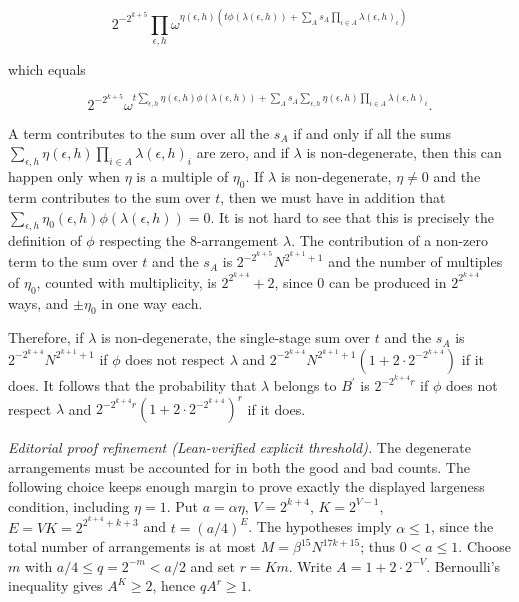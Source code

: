 \documentclass[10pt]{article}
\begin{document}
$$
2^{-2^{k+5}} \prod_{\epsilon, h} \omega^{\eta(\epsilon, h)\left(t \phi(\lambda(\epsilon, h))+\sum_{A} s_{A} \prod_{i \in A}\lambda(\epsilon, h)_{i}\right)}
$$

which equals

$$
2^{-2^{k+5}} \omega^{t \sum_{\epsilon, h} \eta(\epsilon, h) \phi(\lambda(\epsilon, h))+\sum_{A} s_{A} \sum_{\epsilon, h} \eta(\epsilon, h) \prod_{i \in A} \lambda(\epsilon, h)_{i}} .
$$

A term contributes to the sum over all the $s_{A}$ if and only if all the sums $\sum_{\epsilon, h} \eta(\epsilon, h) \prod_{i \in A} \lambda(\epsilon, h)_{i}$ are zero, and if $\lambda$ is non-degenerate, then this can happen only when $\eta$ is a multiple of $\eta_{0}$. If $\lambda$ is non-degenerate, $\eta \neq 0$ and the term contributes to the sum over $t$, then we must have in addition that $\sum_{\epsilon, h} \eta_{0}(\epsilon, h) \phi(\lambda(\epsilon, h))=0$. It is not hard to see that this is precisely the definition of $\phi$ respecting the 8-arrangement $\lambda$. The contribution of a non-zero term to the sum over $t$ and the $s_{A}$ is $2^{-2^{k+5}} N^{2^{k+1}+1}$ and the number of multiples of $\eta_{0}$, counted with multiplicity, is $2^{2^{k+4}}+2$, since 0 can be produced in $2^{2^{k+4}}$ ways, and $\pm \eta_{0}$ in one way each.

Therefore, if $\lambda$ is non-degenerate, the single-stage sum over $t$ and the $s_{A}$ is $2^{-2^{k+4}} N^{2^{k+1}+1}$ if $\phi$ does not respect $\lambda$ and $2^{-2^{k+4}} N^{2^{k+1}+1}\left(1+2\cdot2^{-2^{k+4}}\right)$ if it does. It follows that the probability that $\lambda$ belongs to $B^{\prime}$ is $2^{-2^{k+4} r}$ if $\phi$ does not respect $\lambda$ and $2^{-2^{k+4} r}\left(1+2\cdot2^{-2^{k+4}}\right)^{r}$ if it does.

\textit{Editorial proof refinement (Lean-verified explicit threshold).}
The degenerate arrangements must be accounted for in both the good and bad counts. The following choice keeps enough margin to prove exactly the displayed largeness condition, including $\eta=1$.
Put $a=\alpha\eta$, $V=2^{k+4}$, $K=2^{V-1}$, $E=VK=2^{2^{k+4}+k+3}$ and $t=(a/4)^E$. The hypotheses imply $\alpha\leqslant1$, since the total number of arrangements is at most $M=\beta^{15}N^{17k+15}$; thus $0<a\leqslant1$. Choose $m$ with $a/4\leqslant q=2^{-m}<a/2$ and set $r=Km$. Write $A=1+2\cdot2^{-V}$. Bernoulli's inequality gives $A^K\geqslant2$, hence $qA^r\geqslant1$.
\end{document}

